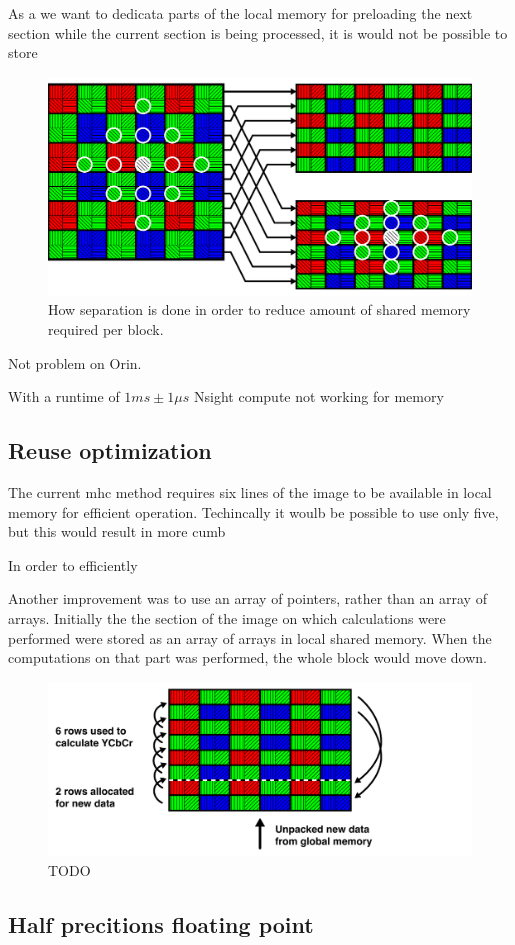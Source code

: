 As a we want to dedicata parts of the local memory for preloading the next section while the current section is being processed, it is would not be possible to store
\begin{figure}[H]
    \centering
    \includegraphics[width=\textwidth]{figures/polarized_image/separation.pdf}
    \caption{How separation is done in order to reduce amount of shared memory required per block.}
    \label{fig:saperation}
\end{figure}
Not problem on Orin.







With a runtime of $1 ms \pm 1 \mu s$
Nsight compute not working for memory











\subsection{Reuse optimization}
The current \gls{mhc} method requires six lines of the image to be available in local memory for efficient operation.
Techincally it woulb be possible to use only five, but this would result in more cumb

In order to efficiently

Another improvement was to use an array of pointers, rather than an array of arrays.
Initially the the section of the image on which calculations were performed were stored as an array of arrays in local shared memory.
When the computations on that part was performed, the whole block would move down.
\begin{figure}[H]
    \centering
    \includegraphics[width=\textwidth]{figures/polarized_image/rolling.pdf}
    \caption{TODO}
\end{figure}





\subsection{Half precitions floating point}
